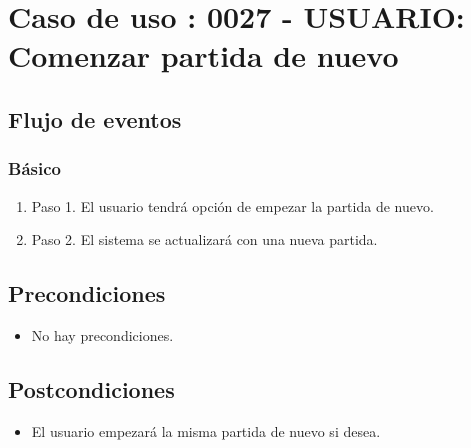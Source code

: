 \section{Caso de uso : 0027 - USUARIO: Comenzar partida de nuevo}\label{sec:uc0}
\subsection{Flujo de eventos}
\subsubsection{Básico}

\begin{enumerate}
\item Paso 1.
El usuario tendrá opción de empezar la partida de nuevo. 
\item Paso 2.
El sistema se actualizará con una nueva partida. 
\end{enumerate}

\subsection{Precondiciones}
\begin{itemize}
\item No hay precondiciones.
\end{itemize}

\subsection{Postcondiciones}
\begin{itemize}
\item El usuario empezará la misma partida de nuevo si desea. 
\end{itemize}


